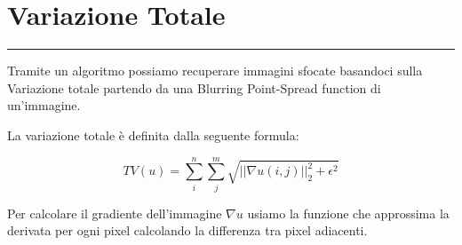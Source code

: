 {\color{rred}\section{Variazione Totale}}
\textcolor{rred}{\rule[5pt]{\textwidth}{1pt}}
Tramite un algoritmo possiamo recuperare immagini sfocate basandoci sulla Variazione totale partendo da una Blurring Point-Spread function di un'immagine. 

La variazione totale è definita dalla seguente formula:                                                                                

\[TV(u) = \sum_i^n{\sum_j^m{\sqrt{||\nabla u(i, j)||_2^2 + \epsilon^2}}}\]

Per calcolare il gradiente dell'immagine $\nabla u$ usiamo la funzione  che approssima la derivata per ogni pixel calcolando la differenza tra pixel adiacenti. 


